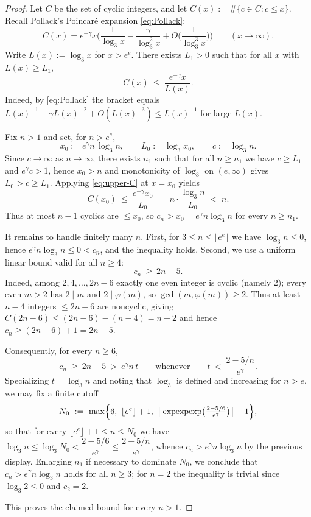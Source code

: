 \documentclass[12pt]{article}
\theoremstyle{remark}
\begin{document}
\begin{proof}
Let $C$ be the set of cyclic integers, and let $C(x):=\#\{c\in C:c\le x\}$. Recall Pollack's Poincar\'e expansion \eqref{eq:Pollack}:
\[
 C(x)=e^{-\gamma}x\Big(\frac{1}{\log_3 x}-\frac{\gamma}{\log_3^2 x}+O\Big(\frac{1}{\log_3^3 x}\Big)\Big)\qquad(x\to\infty).
\]
Write $L(x):=\log_3 x$ for $x>e^e$. There exists $L_1>0$ such that for all $x$ with $L(x)\ge L_1$,
\begin{equation}\label{eq:upper-C}
 C(x)\ \le\ \frac{e^{-\gamma}x}{L(x)}.
\end{equation}
Indeed, by \eqref{eq:Pollack} the bracket equals $L(x)^{-1}-\gamma L(x)^{-2}+O(L(x)^{-3})\le L(x)^{-1}$ for large $L(x)$.

Fix $n>1$ and set, for $n>e^e$,
\[
 x_0:=e^{\gamma}n\,\log_3 n,\qquad L_0:=\log_3 x_0,\qquad c:=\log_3 n.
\]
Since $c\to\infty$ as $n\to\infty$, there exists $n_1$ such that for all $n\ge n_1$ we have $c\ge L_1$ and $e^{\gamma}c>1$, hence $x_0>n$ and monotonicity of $\log_3$ on $(e,\infty)$ gives $L_0>c\ge L_1$. Applying \eqref{eq:upper-C} at $x=x_0$ yields
\[
 C(x_0)\ \le\ \frac{e^{-\gamma}x_0}{L_0}
 \;=\; n\cdot\frac{\log_3 n}{L_0}
 \;<\; n.
\]
Thus at most $n-1$ cyclics are $\le x_0$, so $c_n>x_0=e^{\gamma}n\log_3 n$ for every $n\ge n_1$.

It remains to handle finitely many $n$. First, for $3\le n\le \lfloor e^e\rfloor$ we have $\log_3 n\le0$, hence $e^{\gamma}n\log_3 n\le0<c_n$, and the inequality holds. Second, we use a uniform linear bound valid for all $n\ge4$:
\begin{equation}\label{eq:linear-lb}
 c_n\ \ge\ 2n-5.
\end{equation}
Indeed, among $2,4,\dots,2n-6$ exactly one even integer is cyclic (namely $2$); every even $m>2$ has $2\mid m$ and $2\mid\varphi(m)$, so $\gcd(m,\varphi(m))\ge2$. Thus at least $n-4$ integers $\le2n-6$ are noncyclic, giving $C(2n-6)\le (2n-6)-(n-4)=n-2$ and hence $c_n\ge (2n-6)+1=2n-5$.

Consequently, for every $n\ge6$,
\[
 c_n\ \ge\ 2n-5\ >\ e^{\gamma}n\,t\qquad\text{whenever}\qquad t\ <\ \frac{2-5/n}{e^{\gamma}}.
\]
Specializing $t=\log_3 n$ and noting that $\log_3$ is defined and increasing for $n>e$, we may fix a finite cutoff
\[
 N_0\ :=\ \max\Bigl\{6,\ \lfloor e^e\rfloor+1,\ \big\lfloor\exp\!\exp\!\exp\!\big(\tfrac{2-5/6}{e^{\gamma}}\big)\big\rfloor-1\Bigr\},
\]
so that for every $\lfloor e^e\rfloor+1\le n\le N_0$ we have $\log_3 n\le \log_3 N_0<\dfrac{2-5/6}{e^{\gamma}}\le \dfrac{2-5/n}{e^{\gamma}}$, whence $c_n>e^{\gamma}n\log_3 n$ by the previous display. Enlarging $n_1$ if necessary to dominate $N_0$, we conclude that $c_n>e^{\gamma}n\log_3 n$ holds for all $n\ge3$; for $n=2$ the inequality is trivial since $\log_3 2\le0$ and $c_2=2$.

This proves the claimed bound for every $n>1$.
\end{proof}
\end{document}
